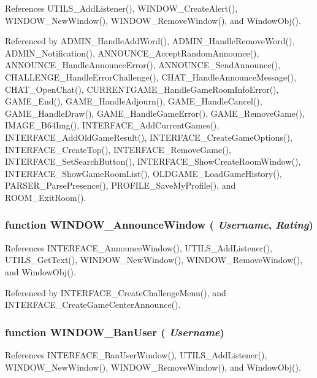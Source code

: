 References UTILS\_\-AddListener(), WINDOW\_\-CreateAlert(), WINDOW\_\-NewWindow(), WINDOW\_\-RemoveWindow(), and WindowObj().

Referenced by ADMIN\_\-HandleAddWord(), ADMIN\_\-HandleRemoveWord(), ADMIN\_\-Notification(), ANNOUNCE\_\-AcceptRandomAnnounce(), ANNOUNCE\_\-HandleAnnounceError(), ANNOUNCE\_\-SendAnnounce(), CHALLENGE\_\-HandleErrorChallenge(), CHAT\_\-HandleAnnounceMessage(), CHAT\_\-OpenChat(), CURRENTGAME\_\-HandleGameRoomInfoError(), GAME\_\-End(), GAME\_\-HandleAdjourn(), GAME\_\-HandleCancel(), GAME\_\-HandleDraw(), GAME\_\-HandleGameError(), GAME\_\-RemoveGame(), IMAGE\_\-B64Img(), INTERFACE\_\-AddCurrentGames(), INTERFACE\_\-AddOldGameResult(), INTERFACE\_\-CreateGameOptions(), INTERFACE\_\-CreateTop(), INTERFACE\_\-RemoveGame(), INTERFACE\_\-SetSearchButton(), INTERFACE\_\-ShowCreateRoomWindow(), INTERFACE\_\-ShowGameRoomList(), OLDGAME\_\-LoadGameHistory(), PARSER\_\-ParsePresence(), PROFILE\_\-SaveMyProfile(), and ROOM\_\-ExitRoom().
\subsubsection[WINDOW\_\-AnnounceWindow]{\setlength{\rightskip}{0pt plus 5cm}function WINDOW\_\-AnnounceWindow ( {\em Username}, \/   {\em Rating})}\label{window_2window_8js_bbaaca094231598caeac94408d8f43c6}




References INTERFACE\_\-AnnounceWindow(), UTILS\_\-AddListener(), UTILS\_\-GetText(), WINDOW\_\-NewWindow(), WINDOW\_\-RemoveWindow(), and WindowObj().

Referenced by INTERFACE\_\-CreateChallengeMenu(), and INTERFACE\_\-CreateGameCenterAnnounce().
\subsubsection[WINDOW\_\-BanUser]{\setlength{\rightskip}{0pt plus 5cm}function WINDOW\_\-BanUser ( {\em Username})}\label{window_2window_8js_5eb3c3f409de48353b62792ae5f3e10c}




References INTERFACE\_\-BanUserWindow(), UTILS\_\-AddListener(), WINDOW\_\-NewWindow(), WINDOW\_\-RemoveWindow(), and WindowObj().

